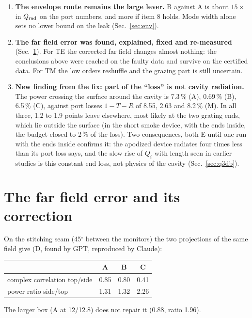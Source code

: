 \documentclass[11pt,a4paper]{article}
\begin{document}
\begin{enumerate}
74\,\% within $\pm10$\,$\mu$m). That is a many parameter problem, which is the adjoint inverse design, not a few
knob cancellation. \textbf{Plain TM} is neither: 42 to 50\,\% reachable, two thirds of its power in a grazing
needle ($|u_x|>0.9$), which calls for a periodic feature (the comb).
\item \textbf{The envelope route remains the large lever.} B against A is about $15\times$ in $Q_{\rm rad}$ on
the port numbers, and more if item 8 holds. Mode width alone sets no lower bound on the leak
(Sec.~\ref{sec:env}).
\item \textbf{The far field error was found, explained, fixed and re-measured} (Sec.~\ref{sec:data}). For TE
the corrected far field changes almost nothing: the conclusions above were reached on the faulty data and
survive on the certified data. For TM the low orders reshuffle and the grazing part is still uncertain.
\item \textbf{New finding from the fix: part of the ``loss'' is not cavity radiation.} The power crossing the
surface around the cavity is 7.3\,\% (A), 0.69\,\% (B), 6.5\,\% (C), against port losses $1-T-R$ of 8.55, 2.63
and 8.2\,\% (M). In all three, 1.2 to 1.9 points leave elsewhere, most likely at the two grating ends, which lie
outside the surface (in the short smoke device, with the ends inside, the budget closed to 2\,\% of the loss).
Two consequences, both E until one run with the ends inside confirms it: the apodized device radiates four
times less than its port loss says, and the slow rise of $Q_i$ with length seen in earlier studies is this
constant end loss, not physics of the cavity (Sec.~\ref{sec:q3db}).
\end{enumerate}

\section{The far field error and its correction}\label{sec:data}
On the stitching seam (45$^\circ$ between the monitors) the two projections of the same field give (D, found by
GPT, reproduced by Claude):
\begin{center}\begin{tabular}{lccc}\hline
 & A & B & C\\\hline
complex correlation top/side & 0.85 & 0.80 & 0.41\\
power ratio side/top & 1.31 & 1.32 & 2.26\\\hline
\end{tabular}\end{center}
The larger box (A at 12/12.8) does not repair it (0.88, ratio 1.96).
\end{document}
